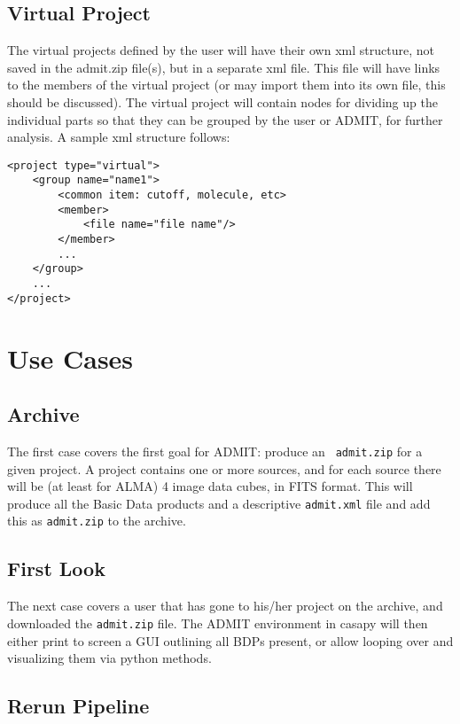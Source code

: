 \documentclass{report}
\begin{document}
\subsection{Virtual Project}
The virtual projects defined by the user will have their own xml structure, not saved in the admit.zip file(s), but in a separate xml file. This file will have links to the members of the virtual project (or may import them into its own file, this should be discussed). The virtual project will contain nodes for dividing up the individual parts so that they can be grouped by the user or ADMIT, for further analysis. A sample xml structure follows:

\begin{verbatim}
<project type="virtual">
    <group name="name1">
    	<common item: cutoff, molecule, etc>
    	<member>
    		<file name="file name"/>
    	</member>
    	...
    </group>
    ...
</project>
\end{verbatim}

\section{Use Cases}

\subsection{Archive}

The first case covers the first goal for ADMIT: produce an {\tt
  admit.zip} for a given project.  A project contains one or more
sources, and for each source there will be (at least for ALMA) 4 image
data cubes, in FITS format. This will produce all the Basic Data
products and a descriptive {\tt admit.xml} file and add this as 
{\tt admit.zip} to the archive.



\subsection{First Look}

The next case covers a user that has gone to his/her project on the archive,
and downloaded the {\tt admit.zip} file. The ADMIT environment in casapy
will then either print to screen a GUI outlining all BDPs present, or
allow looping over and visualizing them via python methods.

\subsection{Rerun Pipeline}
\end{document}
